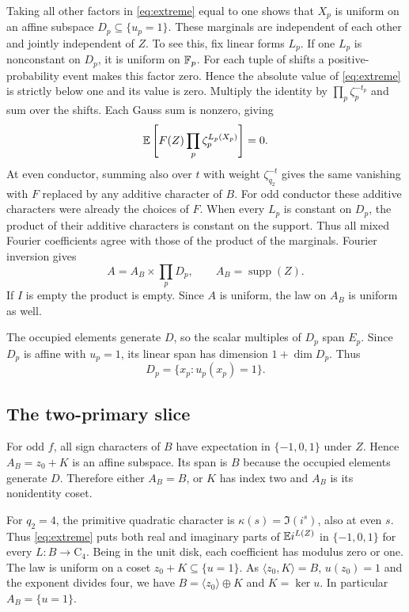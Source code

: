 \documentclass[11pt,letterpaper]{article}
\newcommand{\supp}{\operatorname{supp}}\newcommand{\ord}{\operatorname{ord}}
\newcommand{\Cyc}{\mathrm C}
\newcommand{\z}{\zeta}
\begin{document}
Taking all other factors in \eqref{eq:extreme} equal to one shows that $X_p$ is uniform on an affine subspace $D_p\subseteq\{u_p=1\}$. These marginals are independent of each other and jointly independent of $Z$. To see this, fix linear forms $L_p$. If one $L_p$ is nonconstant on $D_p$, it is uniform on $\mathbb F_p$. For each tuple of shifts a positive-probability event makes this factor zero. Hence the absolute value of \eqref{eq:extreme} is strictly below one and its value is zero. Multiply the identity by $\prod_p\z_p^{-t_p}$ and sum over the shifts. Each Gauss sum is nonzero, giving
\[
 \E\left[F(Z)\prod_p\z_p^{L_p(X_p)}\right]=0 .
\]
At even conductor, summing also over $t$ with weight $\z_{q_2}^{-t}$ gives the same vanishing with $F$ replaced by any additive character of $B$. For odd conductor these additive characters were already the choices of $F$. When every $L_p$ is constant on $D_p$, the product of their additive characters is constant on the support. Thus all mixed Fourier coefficients agree with those of the product of the marginals. Fourier inversion gives
\[
 A=A_B\times\prod_p D_p,\qquad A_B=\supp(Z).
\]
If $I$ is empty the product is empty. Since $A$ is uniform, the law on $A_B$ is uniform as well.

The occupied elements generate $D$, so the scalar multiples of $D_p$ span $E_p$. Since $D_p$ is affine with $u_p=1$, its linear span has dimension $1+\dim D_p$. Thus
\begin{equation}\label{eq:oddplane}
 D_p=\{x_p:u_p(x_p)=1\}.
\end{equation}

\subsection*{The two-primary slice}
For odd $f$, all sign characters of $B$ have expectation in $\{-1,0,1\}$ under $Z$. Hence $A_B=z_0+K$ is an affine subspace. Its span is $B$ because the occupied elements generate $D$. Therefore either $A_B=B$, or $K$ has index two and $A_B$ is its nonidentity coset.

For $q_2=4$, the primitive quadratic character is $\kappa(s)=\Im(i^s)$, also at even $s$. Thus \eqref{eq:extreme} puts both real and imaginary parts of $\mathbb E i^{L(Z)}$ in $\{-1,0,1\}$ for every $L:B\to\Cyc_4$. Being in the unit disk, each coefficient has modulus zero or one. The law is uniform on a coset $z_0+K\subseteq\{u=1\}$. As $\langle z_0,K\rangle=B$, $u(z_0)=1$ and the exponent divides four, we have $B=\langle z_0\rangle\oplus K$ and $K=\ker u$. In particular $A_B=\{u=1\}$.
\end{document}

